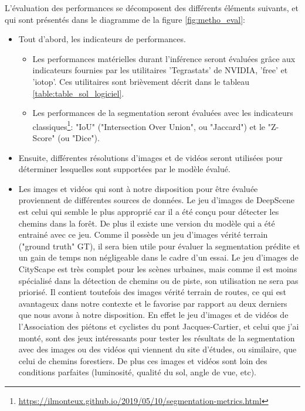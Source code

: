 ﻿L’évaluation des performances se décomposent des différents éléments suivants, et qui sont présentés dans le diagramme de la figure \ref{fig:metho_eval}: 
\begin{itemize}
    \item Tout d'abord, les indicateurs de performances.
    \begin{itemize}
        \item Les performances matérielles durant l'inférence seront évaluées grâce aux indicateurs fournies par les utilitaires 'Tegrastats' de NVIDIA, 'free' et 'iotop'. Ces utilitaires sont brièvement décrit dans le tableau \ref{table:table_sol_logiciel}.
        \item Les performances de la segmentation seront évaluées avec les indicateurs classiques\footnote{\url{https://ilmonteux.github.io/2019/05/10/segmentation-metrics.html}}: "IoU" ("Intersection Over Union", ou "Jaccard") et le "Z-Score" (ou "Dice").
    \end{itemize}
    \item Ensuite, différentes résolutions d'images et de vidéos seront utilisées pour déterminer lesquelles sont supportées par le modèle évalué. 
    \item Les images et vidéos qui sont à notre disposition pour être évaluée proviennent de différentes sources de données. Le jeu d'images de DeepScene est celui qui semble le plus approprié car il a été conçu pour détecter les chemins dans la forêt. De plus il existe une version du modèle qui a été entrainé avec ce jeu. Comme il possède un jeu d'images vérité terrain ("ground truth" GT), il sera bien utile pour évaluer la segmentation prédite et un gain de temps non négligeable dans le cadre d'un essai. Le jeu d'images de CityScape est très complet pour les scènes urbaines, mais comme il est moins spécialisé dans la détection de chemins ou de piste, son utilisation ne sera pas priorisé. Il contient toutefois des images vérité terrain de routes, ce qui est avantageux dans notre contexte et le favorise  par rapport au deux derniers que nous avons à notre disposition. En effet le jeu d'images et de vidéos de l'Association des piétons et cyclistes du pont Jacques-Cartier, et celui que j'ai monté, sont des jeux intéressants pour tester les résultats de la segmentation avec des images ou des vidéos qui viennent du site d'études, ou similaire, que celui de chemins forestiers. De plus ces images et vidéos sont loin des conditions parfaites (luminosité, qualité du sol, angle de vue, etc).

\end{itemize}
